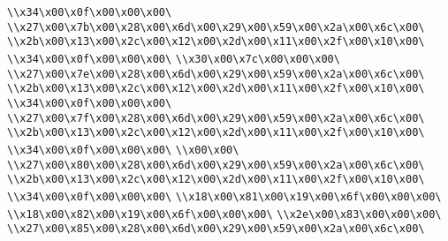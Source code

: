 \verb|\\x34\x00\x0f\x00\x00\x00\|\newline
\verb|\\x27\x00\x7b\x00\x28\x00\x6d\x00\x29\x00\x59\x00\x2a\x00\x6c\x00\|\newline
\verb|\\x2b\x00\x13\x00\x2c\x00\x12\x00\x2d\x00\x11\x00\x2f\x00\x10\x00\|\newline
\verb|\\x34\x00\x0f\x00\x00\x00\|\newline
\verb|\\x30\x00\x7c\x00\x00\x00\|\newline
\verb|\\x27\x00\x7e\x00\x28\x00\x6d\x00\x29\x00\x59\x00\x2a\x00\x6c\x00\|\newline
\verb|\\x2b\x00\x13\x00\x2c\x00\x12\x00\x2d\x00\x11\x00\x2f\x00\x10\x00\|\newline
\verb|\\x34\x00\x0f\x00\x00\x00\|\newline
\verb|\\x27\x00\x7f\x00\x28\x00\x6d\x00\x29\x00\x59\x00\x2a\x00\x6c\x00\|\newline
\verb|\\x2b\x00\x13\x00\x2c\x00\x12\x00\x2d\x00\x11\x00\x2f\x00\x10\x00\|\newline
\verb|\\x34\x00\x0f\x00\x00\x00\|\newline
\verb|\\x00\x00\|\newline
\verb|\\x27\x00\x80\x00\x28\x00\x6d\x00\x29\x00\x59\x00\x2a\x00\x6c\x00\|\newline
\verb|\\x2b\x00\x13\x00\x2c\x00\x12\x00\x2d\x00\x11\x00\x2f\x00\x10\x00\|\newline
\verb|\\x34\x00\x0f\x00\x00\x00\|\newline
\verb|\\x18\x00\x81\x00\x19\x00\x6f\x00\x00\x00\|\newline
\verb|\\x18\x00\x82\x00\x19\x00\x6f\x00\x00\x00\|\newline
\verb|\\x2e\x00\x83\x00\x00\x00\|\newline
\verb|\\x27\x00\x85\x00\x28\x00\x6d\x00\x29\x00\x59\x00\x2a\x00\x6c\x00\|\newline
